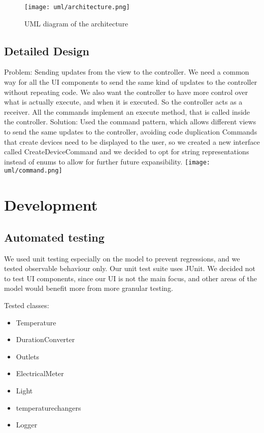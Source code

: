 \documentclass[a4paper,12pt]{report}
\begin{document}
\begin{figure}[H]
\centering{}
\texttt{[image: uml/architecture.png]}
\caption{UML diagram of the architecture}
\label{uml:architecture}
\end{figure}

\section{Detailed Design}
Problem: Sending updates from the view to the controller. 
We need a common way for all the UI components to send the same kind of updates to the controller without repeating code.
We also want the controller to have more control over what is actually execute, and when it is executed. So the controller acts as a receiver.
All the commands implement an execute method, that is called inside the controller.
Solution: Used the command pattern, which allows 
different views to send the same updates to the controller, avoiding code duplication
Commands that create devices need to be displayed to the user, so we created a new interface called CreateDeviceCommand
and we decided to opt for string representations instead of enums to allow for further future expansibility.
\newline
\texttt{[image: uml/command.png]}







\chapter{Development}
\section{Automated testing}
We used unit testing especially on the model to prevent regressions, and we tested observable behaviour only.
Our unit test suite uses JUnit.
We decided not to test UI components, since our UI is not the main focus,
and other areas of the model would benefit more from more granular testing. 

Tested classes:
\begin{itemize}
	\item Temperature
	\item DurationConverter
	\item Outlets
	\item ElectricalMeter
	\item Light
	\item temperaturechangers
	\item Logger
\end{itemize}
\end{document}

